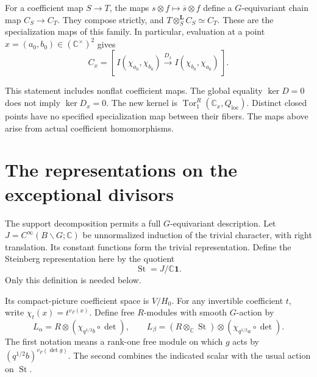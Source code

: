 For a coefficient map $S\to T$, the maps $s\otimes f\mapsto\overline s\otimes f$
define a $G$-equivariant chain map $C_S\to C_T$.
They compose strictly, and
$T\otimes_S^{\mathbf L}C_S\simeq C_T$.
These are the specialization maps of this family.
In particular, evaluation at a point $x=(a_0,b_0)\in(\mathbb C^\times)^2$
gives
\[
 C_x=[\,I(\chi_{a_0},\chi_{b_0})
           \xrightarrow{D_x}I(\chi_{b_0},\chi_{a_0})\,].
\]

This statement includes nonflat coefficient maps.
The global equality $\ker D=0$ does not imply $\ker D_x=0$.
The new kernel is $\operatorname{Tor}^R_1(\mathbb C_x,Q_{\mathrm{loc}})$.
Distinct closed points have no specified specialization map between their fibers.
The maps above arise from actual coefficient homomorphisms.

\section{The representations on the exceptional divisors}

The support decomposition permits a full $G$-equivariant description.
Let $J=C^\infty(B\backslash G;\mathbb C)$ be unnormalized induction of the trivial character,
with right translation.
Its constant functions form the trivial representation.
Define the Steinberg representation here by the quotient
\[
 \operatorname{St}=J/\mathbb C\mathbf1.
\]
Only this definition is needed below.

Its compact-picture coefficient space is $V/H_0$.
For any invertible coefficient $t$, write $\chi_t(x)=t^{v_F(x)}$.
Define free $R$-modules with smooth $G$-action by
\[
 L_\alpha=R\otimes(\chi_{q^{1/2}b}\circ\det),\qquad
 L_\beta=(R\otimes_\mathbb C\operatorname{St})\otimes(\chi_{q^{1/2}a}\circ\det).
\]
The first notation means a rank-one free module on which $g$ acts by
$(q^{1/2}b)^{v_F(\det g)}$.
The second combines the indicated scalar with the usual action on $\operatorname{St}$.

